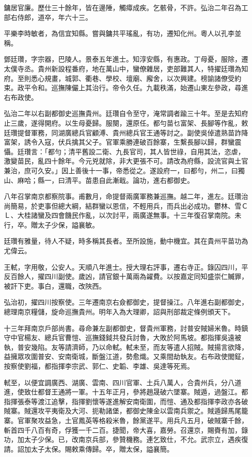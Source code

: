 \begin{pinyinscope}
鏞居官廉。歷仕三十餘年，皆在邊陲，觸瘴成疾。乞骸骨，不許。弘治二年召為工部右侍郎，道卒，年六十三。

平樂李時敏者，為信宜知縣。嘗與鏞共平瑤亂，有功，遷知化州。粵人以孔李並稱。

鄧廷瓚，字宗器，巴陵人。景泰五年進士。知淳安縣，有惠政。丁母憂，服除，遷太僕寺丞。貴州新設程番府，地在萬山中，蠻僚雜居，吏部難其人，特擢廷瓚為知府。至則悉心規畫，城郭、衢巷、學校、壇廟、廨舍，以次興建。榜諭諸僚受約束。政平令和。巡撫陳儼上其治行。帝令久任。九載秩滿，始遷山東左參政，尋進右布政使。

弘治二年以右副都御史巡撫貴州。廷瓚自令至守，淹常調者踰三十年。至是去知府止三歲，遂得開府。以生母憂歸。服闋，還原任。都勻苗乜富架、長腳等作亂，敕廷瓚提督軍務，同湖廣總兵官顧溥、貴州總兵官王通等討之。副使吳倬遣熟苗詐降富架，誘令入寇，伏兵擒其父子。官軍乘勝連破百餘寨，生繫長腳以歸，群蠻震懾。廷瓚言：「都勻；清平舊設二衛、九長官司，其人皆世祿，自用其法，恣虐，激變苗民，亂四十餘年。今元兇就除，非大更張不可。請改為府縣，設流官與土官兼治，庶可久安。」因上善後十一事，帝悉從之。遂設府一，曰都勻，州二，曰獨山、麻哈；縣一，曰清平。苗患自此漸戢。論功，進右都御史。

八年召掌南京都察院事。甫數月，命提督兩廣軍務兼巡撫。越二年，進左。廷瓚治尚簡易，於吏事但總大綱，結群蠻以恩信，不輕用兵，而兵出必成功。鬱林、雪ＣＬ、大桂諸蠻及四會饑民作亂，以次討平，兩廣遂無事。十三年復召掌南院。未行，卒。贈太子少保，謚襄敏。

廷瓚有雅量，待人不疑，時多稱其長者。至所設施，動中機宜。其在貴州平苗功為尤偉云。

王軾，字用敬，公安人。天順八年進士。授大理右評事，遷右寺正。錄囚四川，平反百餘人，擢四川副使。歲凶，請官銀十萬兩為糴費。以按嘉定同知盛崇仁贓罪，被訐下吏。事白，還職，改陜西。

弘治初，擢四川按察使。三年遷南京右僉都御史，提督操江。八年進右副都御史，總理南京糧儲，旋命巡撫貴州。明年入為大理卿，詔與刑部裁定條例頒天下。

十三年拜南京戶部尚書。尋命兼左副都御史，督貴州軍務，討普安賊婦米魯。時鎮守中官楊友、總兵官曹愷、巡撫錢鉞共發兵討魯，大敗於阿馬坡。都指揮吳遠被執，普安幾陷。友等請濟師，乃以命軾。軾未至，而友等遣人招賊。賊揚言欲降，益擁眾攻圍普安、安南衛城，斷盤江道，勢愈熾。又乘間劫執友。右布政使閭鉦，按察使劉福，都指揮李宗武、郭仁、史韜、李雄、吳達等死焉。

軾至，以便宜調廣西、湖廣、雲南、四川官軍、土兵八萬人，合貴州兵，分八道進，使致仕都督王通將一軍。十五年正月，參將趙晟破六墜寨。賊遁，過盤江。都指揮張泰等渡江追擊，指揮劉懷等遂進解安南衛圍，而愷、通及都指揮李政亦各破賊寨。賊還攻平夷衛及大河、扼勒諸堡，都御史陳金以雲南兵禦之。賊遁歸馬尾籠寨。官軍聚攻益急，土官鳳英等格殺米魯，餘黨遂平。用兵凡五月，破賊寨千餘，斬首四千八百有奇，俘獲一千二百。捷聞，帝大喜，嘉勞。召還京，賜賚有加，錄功，加太子少保。已，改南京兵部，參贊機務。連乞致仕，不允。武宗立，遇疾復請。詔加太子太保。賜敕乘傳歸。卒，贈太保，謚襄簡。


\end{pinyinscope}
